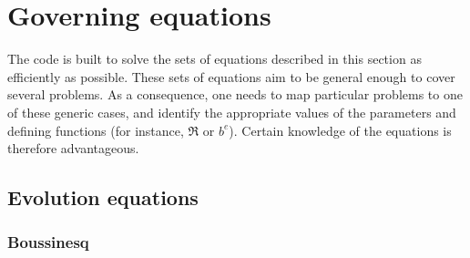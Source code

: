\chapter{Governing equations}\label{sec:equations}

The code is built to solve the sets of equations described in this section as efficiently as possible. These sets of equations aim to be general enough to cover several problems. As a consequence, one needs to map particular problems to one of these generic cases, and identify the appropriate values of the parameters and defining functions (for instance, $\Re$ or $b^e$). Certain knowledge of the equations is therefore advantageous.

\section{Evolution equations}

\subsection{Boussinesq}

